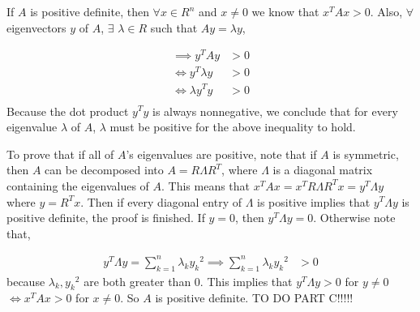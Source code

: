 \documentclass[11pt]{amsart}
\begin{document}
If $A$ is positive definite, then $\forall x \in R^n$ and $x \ne 0$ we know that $x^TAx > 0$. Also, $\forall$ eigenvectors $y$ of $A$, $\exists$ $\lambda \in R$ such that $Ay = \lambda y$,

\begin{align*}
\implies y^TAy &> 0\\
\iff y^T\lambda y &> 0\\
\iff \lambda y^Ty &>0\\ 
\end{align*}
Because the dot product $y^Ty$ is always nonnegative, we conclude that for every eigenvalue $\lambda$ of $A$, $\lambda$ must be positive for the above inequality to hold.

To prove that if all of $A$'s eigenvalues are positive, note that if $A$ is symmetric, then $A$ can be decomposed into $A = R\Lambda R^T$, where $\Lambda$ is a diagonal matrix containing the eigenvalues of $A$. This means that $x^TAx = x^TR\Lambda R^Tx = y^T\Lambda y$ where $y = R^Tx$. Then if every diagonal entry of $\Lambda$ is positive implies that $y^T\Lambda y$ is positive definite, the proof is finished.
If $y=0$, then $y^T\Lambda y = 0$. Otherwise note that,

\begin{align*}
y^T\Lambda y = \sum_{k=1}^{n} \lambda _k {y_k}^2 \implies \sum_{k=1}^{n} \lambda _k {y_k}^2 & > 0 
\end{align*}
because $\lambda _k, {y_k}^2$ are both greater than 0. This implies that $y^T \Lambda y > 0$ for $y \ne 0$ $\iff x^TAx > 0$ for $x \ne 0 $. So $A$ is positive definite. TO DO PART C!!!!!
\end{document}
